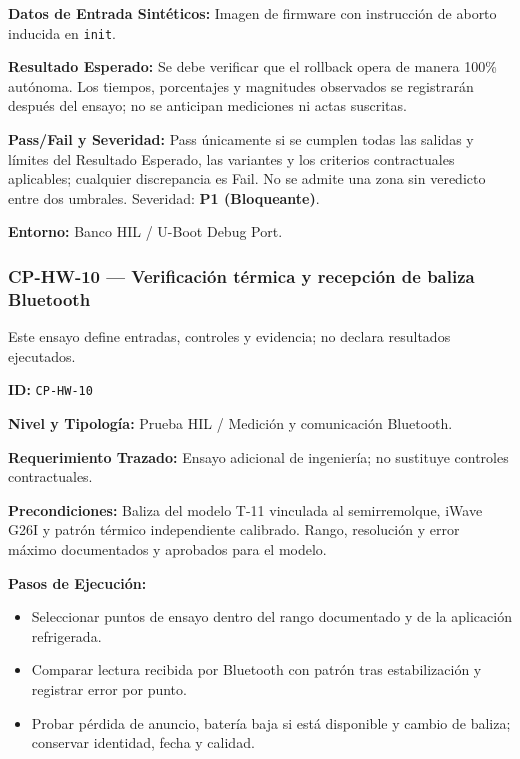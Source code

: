 \par\noindent \textbf{Datos de Entrada Sintéticos:} Imagen de firmware con instrucción de aborto inducida en \texttt{init}.\par
\par\noindent \textbf{Resultado Esperado:} Se debe verificar que el rollback opera de manera 100\% autónoma. Los tiempos, porcentajes y magnitudes observados se registrarán después del ensayo; no se anticipan mediciones ni actas suscritas.\par
\par\noindent \textbf{Pass/Fail y Severidad:} Pass únicamente si se cumplen todas las salidas y límites del Resultado Esperado, las variantes y los criterios contractuales aplicables; cualquier discrepancia es Fail. No se admite una zona sin veredicto entre dos umbrales. Severidad: \textbf{P1 (Bloqueante)}.\par
\par\noindent \textbf{Entorno:} Banco HIL / U-Boot Debug Port.\par


\subsubsection*{CP-HW-10 — Verificación térmica y recepción de baliza Bluetooth}\label{sec:9-cp-hw-10}

Este ensayo define entradas, controles y evidencia; no declara resultados ejecutados.

\par\noindent\textbf{ID:} \texttt{CP-\allowbreak{}HW-\allowbreak{}10}\par
\par\noindent\textbf{Nivel y Tipología:} Prueba HIL / Medición y comunicación Bluetooth.\par
\par\noindent\textbf{Requerimiento Trazado:} Ensayo adicional de ingeniería; no sustituye controles contractuales.\par
\par\noindent\textbf{Precondiciones:} Baliza del modelo T-11 vinculada al semirremolque, iWave G26I y patrón térmico independiente calibrado. Rango, resolución y error máximo documentados y aprobados para el modelo.\par
\par\noindent\textbf{Pasos de Ejecución:}\par
\begin{itemize}
\item Seleccionar puntos de ensayo dentro del rango documentado y de la aplicación refrigerada.
\item Comparar lectura recibida por Bluetooth con patrón tras estabilización y registrar error por punto.
\item Probar pérdida de anuncio, batería baja si está disponible y cambio de baliza; conservar identidad, fecha y calidad.
\end{itemize}

